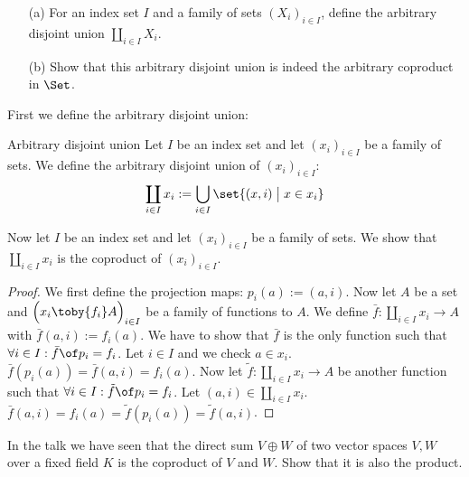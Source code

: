 \begin{exercise}
  \begin{itemize}
    \item[(a)]For an index set $I$ and a family of sets $(X_i)_{i \in I}$, define the arbitrary disjoint union $\coprod_{i \in I}{X_i}$.
    \item[(b)]Show that this arbitrary disjoint union is indeed the arbitrary coproduct in $\Set$.
  \end{itemize}
\end{exercise}

\begin{answer}
  First we define the arbitrary disjoint union:
  \begin{definition}{Arbitrary disjoint union}
    Let $I$ be an index set and let $(x_i)_{i \in I}$ be a family of sets.
    We define the arbitrary disjoint union of $(x_i)_{i\in I}$:
    $$\coprod_{i \in I} {x_i} := \bigcup_{i \in I} \set{ (x, i) \;\big|\; x \in x_i}$$
  \end{definition}
  Now let $I$ be an index set and let $(x_i)_{i\in I}$ be a family of sets. We show that $\coprod_{i \in I} {x_i}$ is the coproduct of $(x_i)_{i\in I}$.
  \begin{proof}
    We first define the projection maps: $p_i(a) := (a, i)$.
    Now let $A$ be a set and $\Bigl(x_i \toby{f_i} A\Bigr)_{i \in I}$ be a family of functions to $A$.
    We define $\bar{f} : \coprod_{i \in I} {x_i} \to A$ with $\bar{f}(a, i) := f_i(a)$.
    We have to show that $\bar{f}$ is the only function such that
    $\forall i \in I: \bar{f} \of p_i = f_i$.
    Let $i \in I$ and we check $a \in x_i$. $\bar{f}(p_i(a)) = \bar{f}(a,i) = f_i(a)$.
    Now let $\tilde{f} : \coprod_{i \in I} {x_i} \to A$ be another function such that
    $\forall i \in I: \tilde{f} \of p_i = f_i$.
    Let $(a, i) \in \coprod_{i \in I} {x_i}$. $\bar{f}(a,i)= f_i(a) = \tilde{f}(p_i(a)) = \tilde{f}(a,i)$.\qedhere
  \end{proof}
\end{answer}

\begin{exercise}
  In the talk we have seen that the direct sum $V \oplus W$ of two vector spaces $V, W$ over a fixed field $K$ is the coproduct of $V$ and $W$.
  Show that it is also the product.
\end{exercise}


